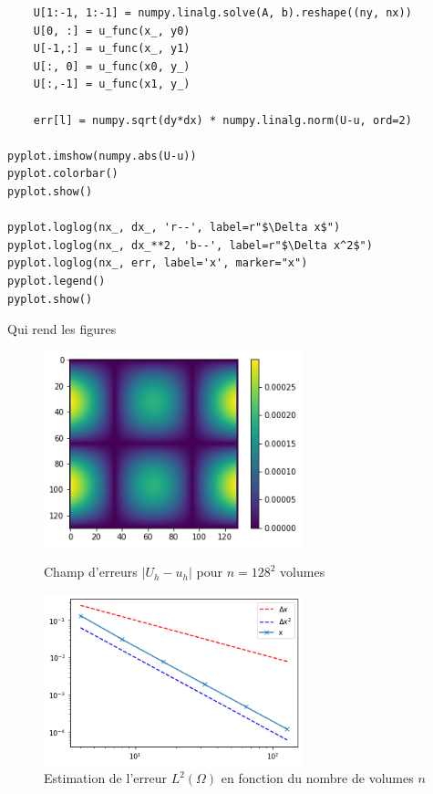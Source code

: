 \begin{verbatim}
    U[1:-1, 1:-1] = numpy.linalg.solve(A, b).reshape((ny, nx))
    U[0, :] = u_func(x_, y0)
    U[-1,:] = u_func(x_, y1)
    U[:, 0] = u_func(x0, y_)
    U[:,-1] = u_func(x1, y_)
    
    err[l] = numpy.sqrt(dy*dx) * numpy.linalg.norm(U-u, ord=2)

pyplot.imshow(numpy.abs(U-u))
pyplot.colorbar()
pyplot.show()

pyplot.loglog(nx_, dx_, 'r--', label=r"$\Delta x$")
pyplot.loglog(nx_, dx_**2, 'b--', label=r"$\Delta x^2$")
pyplot.loglog(nx_, err, label='x', marker="x")
pyplot.legend()
pyplot.show()
\end{verbatim}
Qui rend les figures
\begin{figure}[htp]
    \centering
    \includegraphics[width=7.5cm]{Images/preliminaires/Laplace Dirichlet 2D/erreur.png}
    \caption{Champ d'erreurs $| U_h - u_h |$ pour $n=128^2$ volumes}
    \includegraphics[width=7.5cm]{Images/preliminaires/Laplace Dirichlet 2D/analyse.png}
    \caption{Estimation de l'erreur $L^2(\Omega)$ en fonction du nombre de volumes $n$}
    \label{fig:laplacienDirichlet1D}
\end{figure}

\newpage

